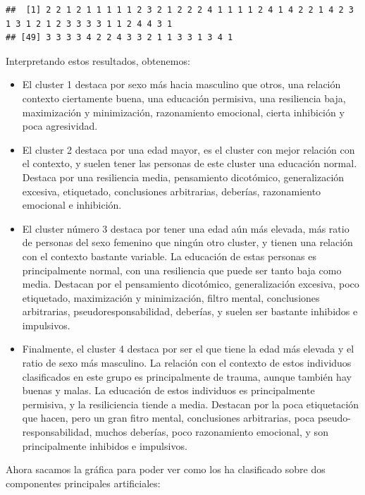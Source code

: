 \documentclass[]{article}
\newenvironment{Shaded}{\begin{snugshade}}{\end{snugshade}}
\newcommand{\KeywordTok}[1]{\textcolor[rgb]{0.13,0.29,0.53}{\textbf{#1}}}
\newcommand{\DataTypeTok}[1]{\textcolor[rgb]{0.13,0.29,0.53}{#1}}
\newcommand{\DecValTok}[1]{\textcolor[rgb]{0.00,0.00,0.81}{#1}}
\newcommand{\StringTok}[1]{\textcolor[rgb]{0.31,0.60,0.02}{#1}}
\newcommand{\CommentTok}[1]{\textcolor[rgb]{0.56,0.35,0.01}{\textit{#1}}}
\newcommand{\OtherTok}[1]{\textcolor[rgb]{0.56,0.35,0.01}{#1}}
\newcommand{\OperatorTok}[1]{\textcolor[rgb]{0.81,0.36,0.00}{\textbf{#1}}}
\newcommand{\NormalTok}[1]{#1}
\begin{document}
\begin{verbatim}
##  [1] 2 2 1 2 1 1 1 1 1 2 3 2 1 2 2 2 4 1 1 1 1 2 4 1 4 2 2 1 4 2 3 1 3 1 2 1 2 3 3 3 3 1 1 2 4 4 3 1
## [49] 3 3 3 3 4 2 2 4 3 3 2 1 1 3 3 1 3 4 1
\end{verbatim}

Interpretando estos resultados, obtenemos:

\begin{itemize}
\item
  El cluster 1 destaca por sexo más hacia masculino que otros, una
  relación contexto ciertamente buena, una educación permisiva, una
  resiliencia baja, maximización y minimización, razonamiento emocional,
  cierta inhibición y poca agresividad.
\item
  El cluster 2 destaca por una edad mayor, es el cluster con mejor
  relación con el contexto, y suelen tener las personas de este cluster
  una educación normal. Destaca por una resiliencia media, pensamiento
  dicotómico, generalización excesiva, etiquetado, conclusiones
  arbitrarias, deberías, razonamiento emocional e inhibición.
\item
  El cluster número 3 destaca por tener una edad aún más elevada, más
  ratio de personas del sexo femenino que ningún otro cluster, y tienen
  una relación con el contexto bastante variable. La educación de estas
  personas es principalmente normal, con una resiliencia que puede ser
  tanto baja como media. Destacan por el pensamiento dicotómico,
  generalización excesiva, poco etiquetado, maximización y minimización,
  filtro mental, conclusiones arbitrarias, pseudoresponsabilidad,
  deberías, y suelen ser bastante inhibidos e impulsivos.
\item
  Finalmente, el cluster 4 destaca por ser el que tiene la edad más
  elevada y el ratio de sexo más masculino. La relación con el contexto
  de estos individuos clasificados en este grupo es principalmente de
  trauma, aunque también hay buenas y malas. La educación de estos
  individuos es principalmente permisiva, y la resiliciencia tiende a
  media. Destacan por la poca etiquetación que hacen, pero un gran fitro
  mental, conclusiones arbitrarias, poca pseudo-responsabilidad, muchos
  deberías, poco razonamiento emocional, y son principalmente inhibidos
  e impulsivos.
\end{itemize}

Ahora sacamos la gráfica para poder ver como los ha clasificado sobre
dos componentes principales artificiales:

\begin{Shaded}
\end{Shaded}
\end{document}
